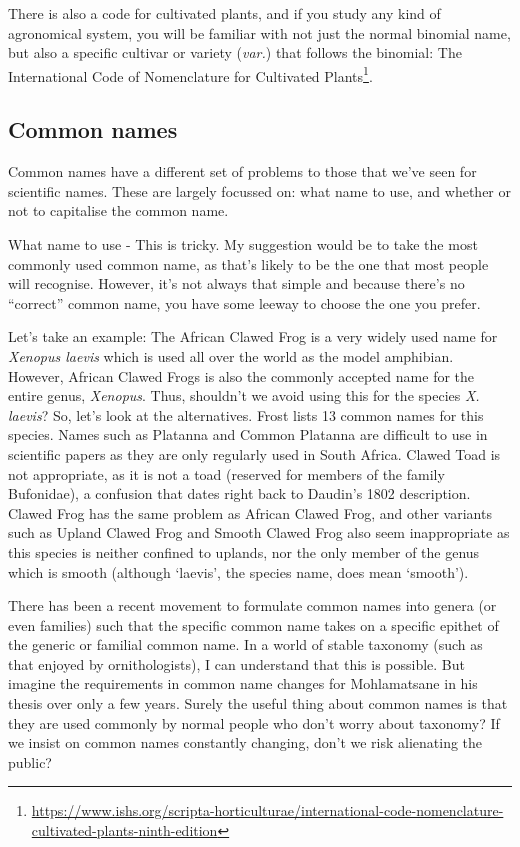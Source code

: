 \documentclass[
]{krantz}
\renewcommand{\href}[2]{#2\footnote{\url{#1}}}
\begin{document}
There is also a code for cultivated plants, and if you study any kind of agronomical system, you will be familiar with not just the normal binomial name, but also a specific cultivar or variety (\emph{var.}) that follows the binomial: \href{https://www.ishs.org/scripta-horticulturae/international-code-nomenclature-cultivated-plants-ninth-edition}{The International Code of Nomenclature for Cultivated Plants}.

\hypertarget{common-names}{%
\subsection{Common names}\label{common-names}}

Common names have a different set of problems to those that we've seen for scientific names. These are largely focussed on: what name to use, and whether or not to capitalise the common name.

What name to use - This is tricky. My suggestion would be to take the most commonly used common name, as that's likely to be the one that most people will recognise. However, it's not always that simple and because there's no ``correct'' common name, you have some leeway to choose the one you prefer.

Let's take an example: The African Clawed Frog is a very widely used name for \emph{Xenopus laevis} which is used all over the world as the model amphibian. However, African Clawed Frogs is also the commonly accepted name for the entire genus, \emph{Xenopus}. Thus, shouldn't we avoid using this for the species \emph{X. laevis}? So, let's look at the alternatives. Frost \citeyearpar{frost2020amphibian} lists 13 common names for this species. Names such as Platanna and Common Platanna are difficult to use in scientific papers as they are only regularly used in South Africa. Clawed Toad is not appropriate, as it is not a toad (reserved for members of the family Bufonidae), a confusion that dates right back to Daudin's 1802 description. Clawed Frog has the same problem as African Clawed Frog, and other variants such as Upland Clawed Frog and Smooth Clawed Frog also seem inappropriate as this species is neither confined to uplands, nor the only member of the genus which is smooth (although `laevis', the species name, does mean `smooth').

There has been a recent movement to formulate common names into genera (or even families) such that the specific common name takes on a specific epithet of the generic or familial common name. In a world of stable taxonomy (such as that enjoyed by ornithologists), I can understand that this is possible. But imagine the requirements in common name changes for Mohlamatsane in his thesis over only a few years. Surely the useful thing about common names is that they are used commonly by normal people who don't worry about taxonomy? If we insist on common names constantly changing, don't we risk alienating the public?
\end{document}
